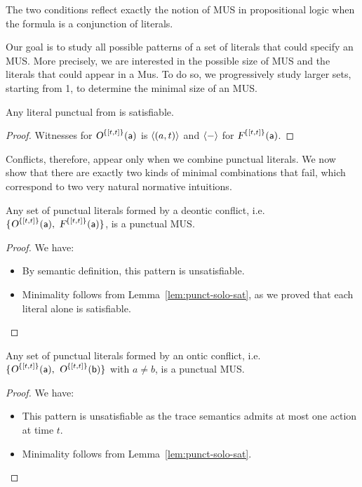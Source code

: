 The two conditions reflect exactly the notion of MUS in propositional logic when the formula is a conjunction of literals.

Our goal is to study all possible patterns of a set of literals that could specify an MUS. More precisely, we are interested in the possible size of MUS and the literals that could appear in a Mus. To do so, we progressively study larger sets, starting from 1, to determine the minimal size of an MUS.

\begin{lemma}\label{lem:punct-solo-sat}
Any literal punctual from \TDDLfm is satisfiable.
\end{lemma}

\begin{proof}
Witnesses for \(\textsl{O}^{\{[t,t]\}}(\mathsf{a})\) is \(\langle (a,t) \rangle \)  and \(\langle - \rangle \) for \(\textsl{F}^{\{[t,t]\}}(\mathsf{a})\).
\end{proof}

Conflicts, therefore, appear only when we combine punctual literals. 
We now show that there are exactly two kinds of minimal combinations that fail, which correspond to two very natural normative intuitions.

\begin{lemma}\label{lem:punct-deontic}
Any set of punctual literals formed by a deontic conflict, i.e. \(\{\ob{\{[t,t]\}}{a},\ \forb{\{[t,t]\}}{a}\}\), is a punctual MUS.
\end{lemma}

\begin{proof}
We have:
\begin{itemize}
\item By semantic definition, this pattern is unsatisfiable.
\item Minimality follows from Lemma~\ref{lem:punct-solo-sat}, as we proved that each literal alone is satisfiable.\end{itemize}
\end{proof}

\begin{lemma}\label{lem:punct-ontic}
Any set of punctual literals formed by an ontic conflict, i.e. \(\{\textsl{O}^{\{[t,t]\}}(\mathsf{a}),\ \textsl{O}^{\{[t,t]\}}(\mathsf{b})\}\) with \(a\neq b\), is a punctual MUS.
\end{lemma}
\begin{proof}
We have:
\begin{itemize}
\item This pattern is unsatisfiable as the trace semantics admits at most one action at time \(t\).
\item Minimality follows from Lemma~\ref{lem:punct-solo-sat}.

\end{itemize}

\end{proof}



